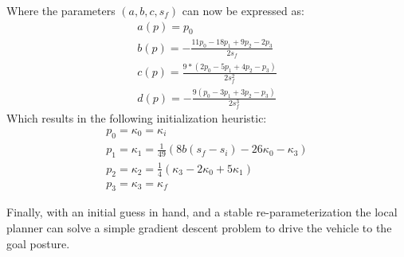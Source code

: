 Where the parameters $(a,b,c,s_f)$ can now be expressed as:
\begin{gather}
	a(p)=p_0\\
	b(p)=-\frac{11p_0 - 18p_1+9p_2-2p_3}{2s_f}\\
	c(p)=\frac{9*(2p_0-5p_1+4p_2-p_3)}{2s_f^2}\\
	d(p)=-\frac{9(p_0-3p_1 +3p_2-p_3)}{2s_f^3}
\end{gather}
Which results in the following initialization heuristic:
\begin{gather}
	p_0=\kappa_0=\kappa_i\\ 
	p_1=\kappa_1= \frac{1}{49}(8b(s_f-s_i)-26\kappa_0-\kappa_3)\\
	p_2=\kappa_2=\frac{1}{4}(\kappa_3-2\kappa_0+5\kappa_1)\\
	p_3=\kappa_3=\kappa_f
\end{gather}

Finally, with an initial guess in hand, and a stable re-parameterization the local planner can solve a simple gradient descent problem to drive the vehicle to the goal posture. 
%

